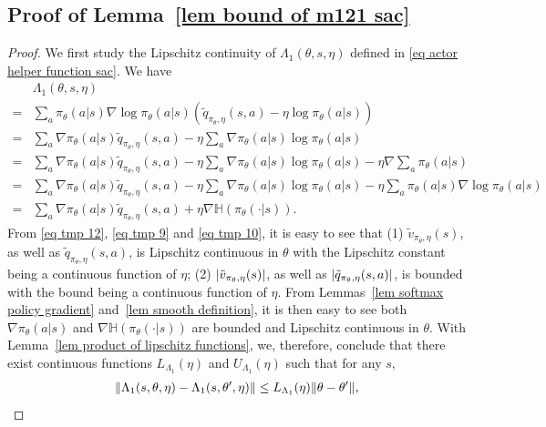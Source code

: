 \documentclass[twoside,11pt]{article}
\newcommand{\ent}[1]{\mathbb{H}\left(#1\right)}
\numberwithin{assucounter}{section}
\begin{document}
\subsection{Proof of Lemma~\ref{lem bound of m121 sac}}
\label{sec proof lem bound of m121 sac}
\lemboundofmonetwoonesac*
\begin{proof}
  We first study the Lipschitz continuity of $\Lambda_1(\theta, s, \eta)$ defined in \eqref{eq actor helper function sac}.
  We have
  \begin{align}
    &\Lambda_1(\theta, s, \eta)\\
    =& \sum_a \pi_\theta(a|s) \nabla \log \pi_\theta(a|s) \left(\tilde q_{\pi_\theta, \eta}(s,a) - \eta \log \pi_\theta (a|s)\right) \\
    =& \sum_a \nabla \pi_\theta(a|s) \tilde q_{\pi_\theta, \eta}(s,a) - \eta \sum_a \nabla \pi_\theta(a|s) \log \pi_\theta (a|s) \\
    =& \sum_a \nabla \pi_\theta(a|s) \tilde q_{\pi_\theta, \eta}(s,a) - \eta \sum_a \nabla \pi_\theta(a|s) \log \pi_\theta (a|s) - \eta \nabla \sum_a \pi_\theta(a|s) \\
    =& \sum_a \nabla \pi_\theta(a|s) \tilde q_{\pi_\theta, \eta}(s,a) - \eta \sum_a \nabla \pi_\theta(a|s) \log \pi_\theta (a|s) - \eta \sum_a \pi_\theta(a|s) \nabla \log \pi_\theta(a|s) \\
    =& \sum_a \nabla \pi_\theta(a|s) \tilde q_{\pi_\theta, \eta}(s,a) + \eta \nabla \ent{\pi_\theta(\cdot | s)}.
  \end{align}
  From \eqref{eq tmp 12}, \eqref{eq tmp 9} and \eqref{eq tmp 10},
  it is easy to see that (1) $\tilde v_{\pi_\theta, \eta}(s)$, as well as $\tilde q_{\pi_\theta, \eta}(s, a)$,
  is Lipschitz continuous in $\theta$ with the Lipschitz constant being a continuous function of $\eta$; 
  (2) $\abs{\tilde v_{\pi_\theta, \eta}(s)}$, as well as $\abs{\tilde q_{\pi_\theta, \eta}(s, a)}$,
  is bounded with the bound being a continuous function of $\eta$.
  From Lemmas~\ref{lem softmax policy gradient} and~\ref{lem smooth definition},
  it is then easy to see both $\nabla \pi_\theta(a|s)$ and $\nabla \ent{\pi_\theta(\cdot | s)}$ are bounded and Lipschitz continuous in $\theta$.
  With Lemma~\ref{lem product of lipschitz functions},
  we, therefore, conclude that 
  there exist continuous functions $L_{\Lambda_1}(\eta)$ and $U_{\Lambda_1}(\eta)$ such that
  for any $s$,
  \begin{align}
    \norm{\Lambda_1(s, \theta, \eta) - \Lambda_1(s, \theta', \eta) } &\leq L_{\Lambda_1}(\eta) \norm{\theta -\theta'}, \\

\end{align}
\end{proof}
\end{document}
